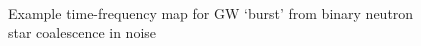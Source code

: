 \documentclass{beamer}
\begin{document}
\begin{frame}
\begin{columns}[]
        \begin{center}
            \begin{figure}
                 \\
                \caption{Example time-frequency map for GW `burst' from
                binary neutron star coalescence in noise}
            \end{figure}
        \end{center}

    \end{columns}


\end{frame}
\end{document}
